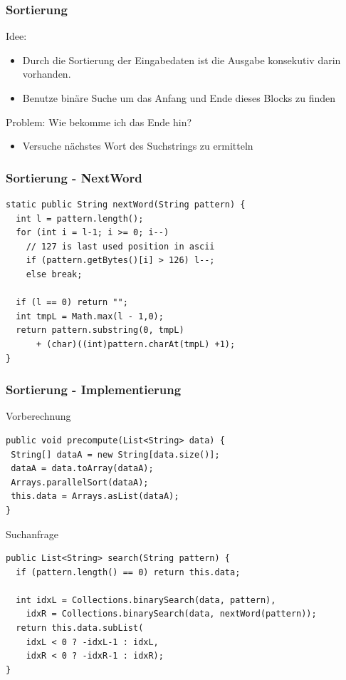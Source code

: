 \documentclass[11pt, xcolor=dvipsnames]{beamer}
\begin{document}
	\begin{frame}
	\frametitle{Sortierung}
	Idee:
	\begin{itemize}
		\item Durch die Sortierung der Eingabedaten ist die Ausgabe konsekutiv darin vorhanden. 
		\item Benutze binäre Suche um das Anfang und Ende dieses Blocks zu finden
	\end{itemize}
	Problem: Wie bekomme ich das Ende hin?
	\begin{itemize}
		\item Versuche nächstes Wort des Suchstrings zu ermitteln
	\end{itemize}	
	\end{frame}
		
\begin{frame}[fragile]
	\frametitle{Sortierung - NextWord}
	\begin{lstlisting}
static public String nextWord(String pattern) {
  int l = pattern.length();	
  for (int i = l-1; i >= 0; i--) 
    // 127 is last used position in ascii
    if (pattern.getBytes()[i] > 126) l--;
    else break;
    	
  if (l == 0) return "";	
  int tmpL = Math.max(l - 1,0);
  return pattern.substring(0, tmpL) 
	  + (char)((int)pattern.charAt(tmpL) +1);
}	
	\end{lstlisting}
\end{frame}
	
\begin{frame}[fragile]
	\frametitle{Sortierung - Implementierung}
	Vorberechnung
	\begin{lstlisting}
public void precompute(List<String> data) {
 String[] dataA = new String[data.size()];
 dataA = data.toArray(dataA);
 Arrays.parallelSort(dataA);
 this.data = Arrays.asList(dataA);		
}	
	\end{lstlisting}
	Suchanfrage
	\begin{lstlisting}
public List<String> search(String pattern) {
  if (pattern.length() == 0) return this.data;
	
  int idxL = Collections.binarySearch(data, pattern),
    idxR = Collections.binarySearch(data, nextWord(pattern));
  return this.data.subList(
	idxL < 0 ? -idxL-1 : idxL, 
	idxR < 0 ? -idxR-1 : idxR);
}
	\end{lstlisting}
\end{frame}
\end{document}
